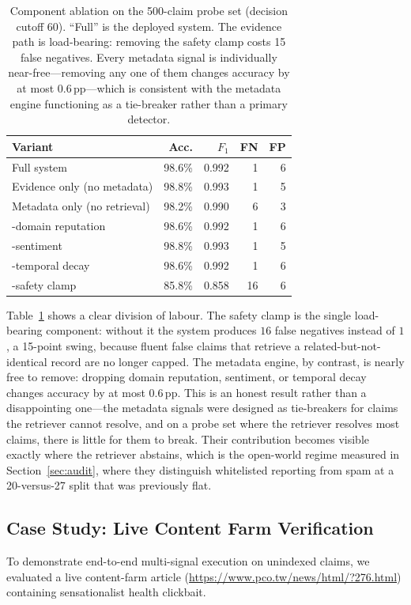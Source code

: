 \documentclass[twoside]{llncs}
\begin{document}
\begin{table}[!htbp]
\caption{Component ablation on the 500-claim probe set (decision cutoff 60). ``Full'' is the deployed system. The evidence path is load-bearing: removing the safety clamp costs 15 false negatives. Every metadata signal is individually near-free---removing any one of them changes accuracy by at most 0.6\,pp---which is consistent with the metadata engine functioning as a tie-breaker rather than a primary detector.}
\label{tab:ablation}
\centering
\small
\begin{tabular}{lrrrr}
\toprule
\textbf{Variant} & \textbf{Acc.} & \textbf{$F_1$} & \textbf{FN} & \textbf{FP} \\
\midrule
Full system & 98.6\% & 0.992 & 1 & 6 \\
Evidence only (no metadata) & 98.8\% & 0.993 & 1 & 5 \\
Metadata only (no retrieval) & 98.2\% & 0.990 & 6 & 3 \\
$\text{-}$domain reputation & 98.6\% & 0.992 & 1 & 6 \\
$\text{-}$sentiment & 98.8\% & 0.993 & 1 & 5 \\
$\text{-}$temporal decay & 98.6\% & 0.992 & 1 & 6 \\
$\text{-}$safety clamp & 85.8\% & 0.858 & 16 & 6 \\
\bottomrule
\end{tabular}
\end{table}

Table~\ref{tab:ablation} shows a clear division of labour. The safety clamp is the single load-bearing component: without it the system produces $16$ false negatives instead of $1$, a 15-point swing, because fluent false claims that retrieve a related-but-not-identical record are no longer capped. The metadata engine, by contrast, is nearly free to remove: dropping domain reputation, sentiment, or temporal decay changes accuracy by at most $0.6$\,pp. This is an honest result rather than a disappointing one---the metadata signals were designed as tie-breakers for claims the retriever cannot resolve, and on a probe set where the retriever resolves most claims, there is little for them to break. Their contribution becomes visible exactly where the retriever abstains, which is the open-world regime measured in Section~\ref{sec:audit}, where they distinguish whitelisted reporting from spam at a 20-versus-27 split that was previously flat.

\subsection{Case Study: Live Content Farm Verification}
\label{sec:case}
To demonstrate end-to-end multi-signal execution on unindexed claims, we evaluated a live content-farm article (\url{https://www.pco.tw/news/html/?276.html}) containing sensationalist health clickbait. 
\end{document}
